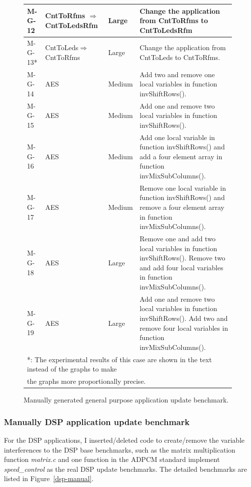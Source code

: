 \begin{figure}[htbp]
\begin{small}
\begin{tabular}{||p{0.6in}|p{1in}|p{0.5in}|p{3.5in}||}
M-G-12 & CntToRfms $\Rightarrow$ CntToLedsRfm &Large & Change the application from CntToRfms to CntToLedsRfm \\ \hline 

M-G-13* &CntToLeds$\Rightarrow$ CntToRfms &Large & Change the application from CntToLeds to CntToRfms. \\ \hline 

M-G-14 & AES & Medium & Add two and remove one local variables in function invShiftRows().
\\ \hline
M-G-15 & AES & Medium & Add one and remove two local variables in function invShiftRows().
\\ \hline

M-G-16 & AES & Medium & Add one local variable in function invShiftRows() and add a four element array in function invMixSubColumns().\\ \hline
M-G-17 & AES & Medium & Remove one local variable in function invShiftRows() and remove a four element array in function invMixSubColumns().\\ \hline


M-G-18 & AES & Large & Remove one and add two local variables in function invShiftRows(). Remove two and add four local variables in function invMixSubColumns().\\ \hline
M-G-19 & AES & Large & Add one and remove two local variables in function invShiftRows(). Add two and remove four local variables in function invMixSubColumns().\\ \hline

\multicolumn{4}{l}{*: The experimental results of this case are shown in the text instead of the graphs to make}\\
\multicolumn{4}{l}{the graphs more proportionally precise.}\\

\end{tabular}
\end{small}
\caption{Manually generated general purpose application update benchmark.}
\label{fbench.chg1}
\end{figure}


\subsubsection{Manually DSP application update benchmark}
For the DSP applications, I inserted/deleted code to create/remove the variable interferences to the DSP base benchmarks, such as the matrix multiplication function {\it matrix.c} and one function in the ADPCM standard implement {\it speed\_control} as the real DSP update benchmarks. 
The detailed benchmarks are listed in Figure~\ref{dsp-manual}. 

